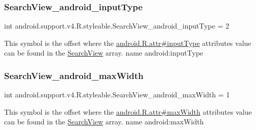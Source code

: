 \subsubsection{\texorpdfstring{Search\+View\+\_\+android\+\_\+input\+Type}{SearchView\_android\_inputType}}
{\footnotesize\ttfamily int android.\+support.\+v4.\+R.\+styleable.\+Search\+View\+\_\+android\+\_\+input\+Type = 2\hspace{0.3cm}{\ttfamily [static]}}

This symbol is the offset where the \hyperlink{}{android.\+R.\+attr\#input\+Type} attribute\textquotesingle{}s value can be found in the \hyperlink{classandroid_1_1support_1_1v4_1_1R_1_1styleable_a7f709410d566e9fd5d4c710e815c300a}{Search\+View} array.  name android\+:input\+Type \mbox{\label{classandroid_1_1support_1_1v4_1_1R_1_1styleable_aa1fcd209f07b6bb82802f5b87852f157}} 
\subsubsection{\texorpdfstring{Search\+View\+\_\+android\+\_\+max\+Width}{SearchView\_android\_maxWidth}}
{\footnotesize\ttfamily int android.\+support.\+v4.\+R.\+styleable.\+Search\+View\+\_\+android\+\_\+max\+Width = 1\hspace{0.3cm}{\ttfamily [static]}}

This symbol is the offset where the \hyperlink{}{android.\+R.\+attr\#max\+Width} attribute\textquotesingle{}s value can be found in the \hyperlink{classandroid_1_1support_1_1v4_1_1R_1_1styleable_a7f709410d566e9fd5d4c710e815c300a}{Search\+View} array.  name android\+:max\+Width \mbox{\label{classandroid_1_1support_1_1v4_1_1R_1_1styleable_af517a70a4f7a1112d44a394839d8ffaf}} 
